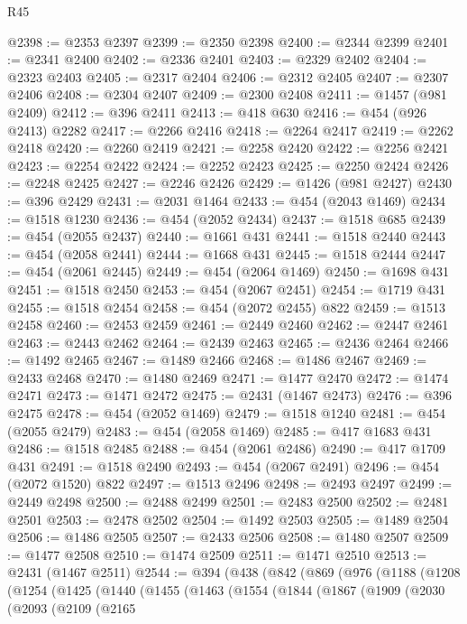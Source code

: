 \begin{lexlean}{R45}
\begin{coremodule}
@2398 := @2353 @2397
@2399 := @2350 @2398
@2400 := @2344 @2399
@2401 := @2341 @2400
@2402 := @2336 @2401
@2403 := @2329 @2402
@2404 := @2323 @2403
@2405 := @2317 @2404
@2406 := @2312 @2405
@2407 := @2307 @2406
@2408 := @2304 @2407
@2409 := @2300 @2408
@2411 := @1457 (@981 @2409)
@2412 := @396 @2411
@2413 := @418 @630
@2416 := @454 (@926 @2413) @2282
@2417 := @2266 @2416
@2418 := @2264 @2417
@2419 := @2262 @2418
@2420 := @2260 @2419
@2421 := @2258 @2420
@2422 := @2256 @2421
@2423 := @2254 @2422
@2424 := @2252 @2423
@2425 := @2250 @2424
@2426 := @2248 @2425
@2427 := @2246 @2426
@2429 := @1426 (@981 @2427)
@2430 := @396 @2429
@2431 := @2031 @1464
@2433 := @454 (@2043 @1469)
@2434 := @1518 @1230
@2436 := @454 (@2052 @2434)
@2437 := @1518 @685
@2439 := @454 (@2055 @2437)
@2440 := @1661 @431
@2441 := @1518 @2440
@2443 := @454 (@2058 @2441)
@2444 := @1668 @431
@2445 := @1518 @2444
@2447 := @454 (@2061 @2445)
@2449 := @454 (@2064 @1469)
@2450 := @1698 @431
@2451 := @1518 @2450
@2453 := @454 (@2067 @2451)
@2454 := @1719 @431
@2455 := @1518 @2454
@2458 := @454 (@2072 @2455) @822
@2459 := @1513 @2458
@2460 := @2453 @2459
@2461 := @2449 @2460
@2462 := @2447 @2461
@2463 := @2443 @2462
@2464 := @2439 @2463
@2465 := @2436 @2464
@2466 := @1492 @2465
@2467 := @1489 @2466
@2468 := @1486 @2467
@2469 := @2433 @2468
@2470 := @1480 @2469
@2471 := @1477 @2470
@2472 := @1474 @2471
@2473 := @1471 @2472
@2475 := @2431 (@1467 @2473)
@2476 := @396 @2475
@2478 := @454 (@2052 @1469)
@2479 := @1518 @1240
@2481 := @454 (@2055 @2479)
@2483 := @454 (@2058 @1469)
@2485 := @417 @1683 @431
@2486 := @1518 @2485
@2488 := @454 (@2061 @2486)
@2490 := @417 @1709 @431
@2491 := @1518 @2490
@2493 := @454 (@2067 @2491)
@2496 := @454 (@2072 @1520) @822
@2497 := @1513 @2496
@2498 := @2493 @2497
@2499 := @2449 @2498
@2500 := @2488 @2499
@2501 := @2483 @2500
@2502 := @2481 @2501
@2503 := @2478 @2502
@2504 := @1492 @2503
@2505 := @1489 @2504
@2506 := @1486 @2505
@2507 := @2433 @2506
@2508 := @1480 @2507
@2509 := @1477 @2508
@2510 := @1474 @2509
@2511 := @1471 @2510
@2513 := @2431 (@1467 @2511)
@2544 := @394
    (@438
      (@842
        (@869
          (@976
            (@1188
              (@1208
                (@1254
                  (@1425
                    (@1440
                      (@1455
                        (@1463
                          (@1554
                            (@1844
                              (@1867
                                (@1909
                                  (@2030
                                    (@2093
                                      (@2109
                                        (@2165

\end{coremodule}
\end{lexlean}

